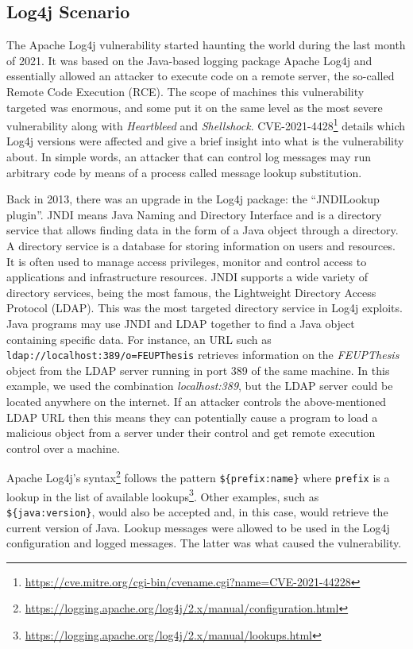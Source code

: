 \subsection{Log4j Scenario} \label{sec:validation_log4j_scenario}

The Apache Log4j vulnerability started haunting the world during the last month of 2021. It was based on the Java-based logging package Apache Log4j and essentially allowed an attacker to execute code on a remote server, the so-called Remote Code Execution (RCE). The scope of machines this vulnerability targeted was enormous, and some put it on the same level as the most severe vulnerability along with \textit{Heartbleed} and \textit{Shellshock}. CVE-2021-4428\footnote{\url{https://cve.mitre.org/cgi-bin/cvename.cgi?name=CVE-2021-44228}} details which Log4j versions were affected and give a brief insight into what is the vulnerability about. In simple words, an attacker that can control log messages may run arbitrary code by means of a process called message lookup substitution.

Back in 2013, there was an upgrade in the Log4j package: the ``JNDILookup plugin''. JNDI means Java Naming and Directory Interface and is a directory service that allows finding data in the form of a Java object through a directory. A directory service is a database for storing information on users and resources. It is often used to manage access privileges, monitor and control access to applications and infrastructure resources. JNDI supports a wide variety of directory services, being the most famous, the Lightweight Directory Access Protocol (LDAP). This was the most targeted directory service in Log4j exploits. Java programs may use JNDI and LDAP together to find a Java object containing specific data. For instance, an URL such as \texttt{ldap://localhost:389/o=FEUPThesis} retrieves information on the \textit{FEUPThesis} object from the LDAP server running in port 389 of the same machine. In this example, we used the combination \textit{localhost:389}, but the LDAP server could be located anywhere on the internet. If an attacker controls the above-mentioned LDAP URL then this means they can potentially cause a program to load a malicious object from a server under their control and get remote execution control over a machine.

Apache Log4j's syntax\footnote{\url{https://logging.apache.org/log4j/2.x/manual/configuration.html}} follows the pattern \texttt{\$\{prefix:name\}} where \texttt{prefix} is a lookup in the list of available lookups\footnote{\url{https://logging.apache.org/log4j/2.x/manual/lookups.html}}. Other examples, such as \texttt{\$\{java:version\}}, would also be accepted and, in this case, would retrieve the current version of Java. Lookup messages were allowed to be used in the Log4j configuration and logged messages. The latter was what caused the vulnerability.

